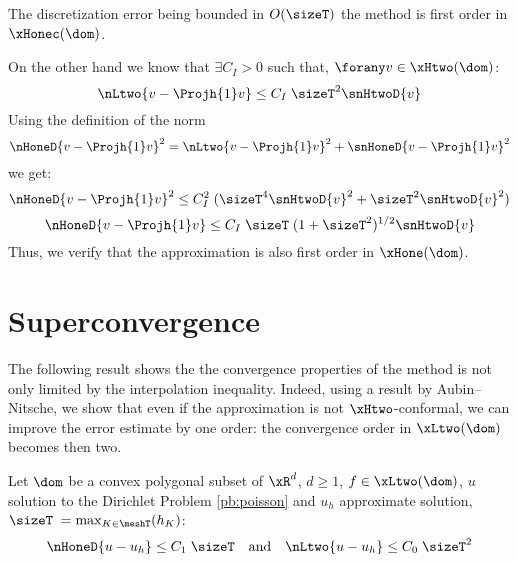 The discretization error being bounded in $O(\sizeT)$ the method is first order in $\xHonec(\dom)$.

\begin{rmrk}
On the other hand we know that $\exists C_I > 0 $ such that, $\forany v \in \xHtwo(\dom)$:
\begin{equation*}
\nLtwo{v - \Projh{1} v} \leq C_I\; \sizeT^2 \snHtwoD{v}
\end{equation*}
Using the definition of the norm
\begin{equation*}
\nHoneD{v - \Projh{1} v}^2 = \nLtwo{v - \Projh{1} v}^2 + \snHoneD{v - \Projh{1} v}^2
\end{equation*}
we get:
\begin{equation*}
\nHoneD{v - \Projh{1} v}^2 \leq C_I^2\; (\sizeT^4 \snHtwoD{v}^2 + \sizeT^2 \snHtwoD{v}^2)
\end{equation*}
\begin{equation*}
\nHoneD{v - \Projh{1} v} \leq C_I\; \sizeT\;(1 + \sizeT^2)^{1/2} \snHtwoD{v}
\end{equation*}
Thus, we verify that the approximation is also first order in $\xHone(\dom)$.
\end{rmrk}

\section{Superconvergence}

The following result shows the the convergence properties of the method is not only limited by the interpolation inequality.
Indeed, using a result by Aubin--Nitsche, we show that even if the approximation is not $\xHtwo$-conformal, we can improve the error estimate by one order: the convergence order in $\xLtwo(\dom)$ becomes then two.

\begin{thrm}[Superconvergence]
Let $\dom$ be a convex polygonal subset of $\xR^d$, $d \geq 1$, $f \in \xLtwo(\dom)$, $u$ solution to the Dirichlet Problem \eqref{pb:poisson} and $u_h$ approximate solution, $\sizeT\;= \max_{K\in\meshT}(h_K)$:
\begin{equation*}
\nHoneD{u - u_h}  \leq C_1\;\sizeT\quad\mbox{and}\quad\nLtwo{u - u_h}  \leq C_0\;\sizeT^2
\end{equation*}
\end{thrm}

